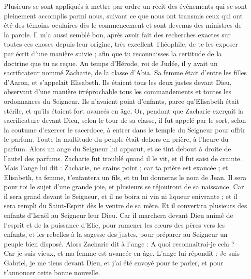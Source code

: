 \BFont
\begin{multicols}{2}
\TextTitle{[Introduction]}
\VerseOne{}Plusieurs se sont appliqués à mettre par ordre un récit des évènements qui se sont pleinement accomplis parmi nous,
suivant ce que nous ont transmis ceux qui ont été des témoins oculaires dès le commencement et sont devenus des ministres de la parole.
Il m'a aussi semblé bon, après avoir fait des recherches exactes sur toutes ces choses depuis leur origine, très excellent Théophile, de te les exposer par écrit d’une manière suivie ;
afin que tu reconnaisses la certitude de la doctrine que tu as reçue.
Au temps d'Hérode, roi de Judée, il y avait un sacrificateur nommé Zacharie, de la classe d'Abia. Sa femme était d’entre les filles d'Aaron, et s’appelait Elisabeth.
Ils étaient tous les deux justes devant Dieu, observant d’une manière irréprochable tous les commandements et toutes les ordonnances du Seigneur.
Ils n'avaient point d'enfants, parce qu'Elisabeth était stérile, et qu'ils étaient fort avancés en âge.
Or, pendant que Zacharie exerçait la sacrificature devant Dieu, selon le tour de sa classe, il fut appelé par le sort,
selon la coutume d'exercer le sacerdoce, à entrer dans le temple du Seigneur pour offrir le parfum.
Toute la multitude du peuple était dehors en prière, à l'heure du parfum.
Alors un ange du Seigneur lui apparut, et se tint debout à droite de l'autel des parfums.
Zacharie fut troublé quand il le vit, et il fut saisi de crainte.
Mais l'ange lui dit : Zacharie, ne crains point ; car ta prière est exaucée ; et Elisabeth, ta femme, t’enfantera un fils, et tu lui donneras le nom de Jean.
Il sera pour toi le sujet d’une grande joie, et plusieurs se réjouiront de sa naissance.
Car il sera grand devant le Seigneur, et il ne boira ni vin ni liqueur enivrante ; et il sera rempli du Saint-Esprit dès le ventre de sa mère.
Et il convertira plusieurs des enfants d'Israël au Seigneur leur Dieu.
Car il marchera devant Dieu animé de l'esprit et de la puissance d'Elie, pour ramener les cœurs des pères vers les enfants, et les rebelles à la sagesse des justes, pour préparer au Seigneur un peuple bien disposé.
Alors Zacharie dit à l'ange : A quoi reconnaîtrai-je cela ? Car je suis vieux, et ma femme est avancée en âge.
L'ange lui répondit : Je suis Gabriel, je me tiens devant Dieu, et j’ai été envoyé pour te parler, et pour t'annoncer cette bonne nouvelle.

\end{multicols}
